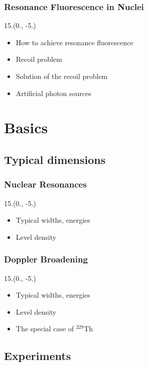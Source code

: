 \documentclass{beamer}
\begin{document}
\begin{frame}
    \frametitle{Resonance Fluorescence in Nuclei}
    \begin{textblock}{15.}(0., -5.)
        \begin{itemize}
            \item How to achieve resonance fluorescence
            \item Recoil problem
            \item Solution of the recoil problem
            \item Artificial photon sources
        \end{itemize}
    \end{textblock}
\end{frame}

\section{Basics}

\subsection{Typical dimensions}

\begin{frame}
    \frametitle{Nuclear Resonances}
    \begin{textblock}{15.}(0., -5.)
        \begin{itemize}
            \item Typical widths, energies
            \item Level density
        \end{itemize}
    \end{textblock}
\end{frame}

\begin{frame}
    \frametitle{Doppler Broadening}
    \begin{textblock}{15.}(0., -5.)
        \begin{itemize}
            \item Typical widths, energies
            \item Level density
            \item The special case of $^{229}$Th
        \end{itemize}
    \end{textblock}
\end{frame}

\subsection{Experiments}
\end{document}
